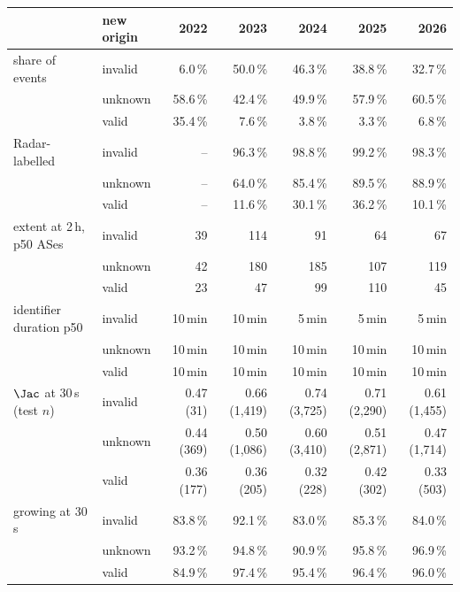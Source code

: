 \begin{tabular}{llrrrrr}
\toprule
 & new origin & 2022 & 2023 & 2024 & 2025 & 2026 \\
\midrule
share of events & invalid & 6.0\,\% & 50.0\,\% & 46.3\,\% & 38.8\,\% & 32.7\,\% \\
 & unknown & 58.6\,\% & 42.4\,\% & 49.9\,\% & 57.9\,\% & 60.5\,\% \\
 & valid & 35.4\,\% & 7.6\,\% & 3.8\,\% & 3.3\,\% & 6.8\,\% \\
Radar-labelled & invalid & -- & 96.3\,\% & 98.8\,\% & 99.2\,\% & 98.3\,\% \\
 & unknown & -- & 64.0\,\% & 85.4\,\% & 89.5\,\% & 88.9\,\% \\
 & valid & -- & 11.6\,\% & 30.1\,\% & 36.2\,\% & 10.1\,\% \\
extent at 2\,h, p50 ASes & invalid & 39 & 114 & 91 & 64 & 67 \\
 & unknown & 42 & 180 & 185 & 107 & 119 \\
 & valid & 23 & 47 & 99 & 110 & 45 \\
identifier duration p50 & invalid & 10\,min & 10\,min & 5\,min & 5\,min & 5\,min \\
 & unknown & 10\,min & 10\,min & 10\,min & 10\,min & 10\,min \\
 & valid & 10\,min & 10\,min & 10\,min & 10\,min & 10\,min \\
$\Jac$ at 30\,s (test $n$) & invalid & 0.47 (31) & 0.66 (1,419) & 0.74 (3,725) & 0.71 (2,290) & 0.61 (1,455) \\
 & unknown & 0.44 (369) & 0.50 (1,086) & 0.60 (3,410) & 0.51 (2,871) & 0.47 (1,714) \\
 & valid & 0.36 (177) & 0.36 (205) & 0.32 (228) & 0.42 (302) & 0.33 (503) \\
growing at 30\,s & invalid & 83.8\,\% & 92.1\,\% & 83.0\,\% & 85.3\,\% & 84.0\,\% \\
 & unknown & 93.2\,\% & 94.8\,\% & 90.9\,\% & 95.8\,\% & 96.9\,\% \\
 & valid & 84.9\,\% & 97.4\,\% & 95.4\,\% & 96.4\,\% & 96.0\,\% \\
\bottomrule
\end{tabular}
